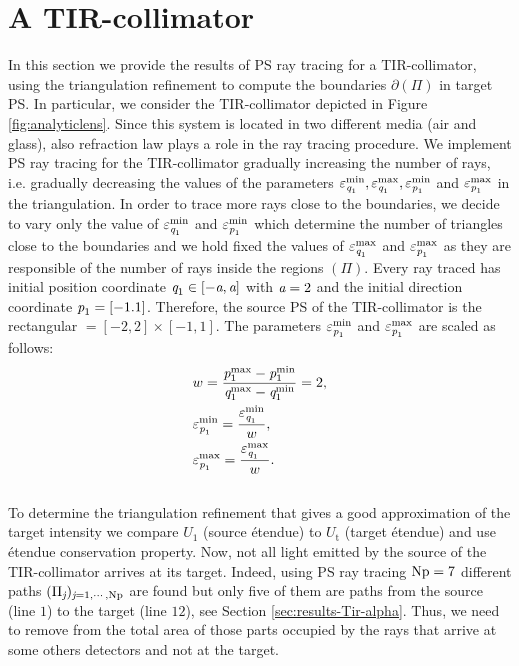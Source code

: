 \section{A TIR-collimator}
In this section we provide the results of PS ray tracing for a TIR-collimator, using the triangulation refinement to compute the boundaries $\partial$$(\Pi)$ in target PS. In particular, we consider the TIR-collimator depicted in Figure \ref{fig:analyticlens}. Since this system is located in two different media (air and glass), also refraction law plays a role in the ray tracing procedure. We implement PS ray tracing for the TIR-collimator gradually increasing the number of rays, i.e. gradually decreasing the values of the parameters $\varepsilon_{\textit{q}_1}^{\textrm{min}}, \varepsilon_{\textit{q}_1}^{\textrm{max}}, \varepsilon_{\textit{p}_1}^{\textrm{min}}$ and $\varepsilon_{\textit{p}_1}^{\textrm{max}}$ in the triangulation. In order to trace more rays close to the boundaries, we decide to vary only the value of $\varepsilon_{\textit{q}_1}^{\textrm{min}}$ and $ \varepsilon_{\textit{p}_1}^{\textrm{min}}$ which determine the number of triangles close to the boundaries and we hold fixed the values of $ \varepsilon_{\textit{q}_1}^{\textrm{max}}$ and $ \varepsilon_{\textit{p}_1}^{\textrm{max}}$ as they are responsible of the number of rays inside the regions $(\Pi)$. Every ray traced has initial position coordinate $\textit{q}_1\in[-\textit{a}, \textit{a}]$ with $\textit{a}=2$ and the initial direction coordinate $\textit{p}_1=[-1.1]$. Therefore, the source PS of the TIR-collimator is the rectangular $= [-2, 2] \times [-1, 1]$. The parameters $\varepsilon_{\textit{p}_1}^{\textrm{min}}$ and $\varepsilon_{\textit{p}_1}^{\textrm{max}}$ are scaled as follows:
\begin{equation}
\begin{aligned}
& w = \frac{\textit{p}_1^{\textrm{max}}-\textit{p}_1^{\textrm{min}}}{\textit{q}_1^{\textrm{max}}-\textit{q}_1^{\textrm{min}}}=2,\\
&\varepsilon_{\textit{p}_1}^{\textrm{min}}= \frac{\varepsilon_{\textit{q}_1}^{\textrm{min}}}{w}, \\
&\varepsilon_{\textit{p}_1}^{\textrm{max}}= \frac{\varepsilon_{\textit{q}_1}^{\textrm{max}}}{w}.
\end{aligned}
\end{equation}
\\ \indent To determine the triangulation refinement that gives a good approximation of the target intensity we compare $U_1$ (source \'{e}tendue) to $U_{\textrm{t}}$ (target \'{e}tendue) and use \'{e}tendue conservation property. Now, not all light emitted by the source of the TIR-collimator arrives at its target. Indeed, using PS ray tracing $\textrm{Np}=7$ different paths $(\Pi_{\textit{j}})_{\textit{j}=1, \cdots, \textrm{Np}}$ are found but only five of them are paths from the source (line $1$) to the target (line $12$), see Section \ref{sec:results-Tir-alpha}. Thus, we need to remove from the total area of  those parts occupied by the rays that arrive at some others detectors and not at the target. %
